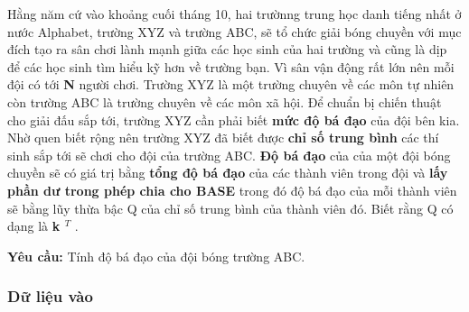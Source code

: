 





    Hằng năm cứ vào khoảng cuối tháng 10, hai trườnng trung học danh tiếng nhất ở nước Alphabet, trường XYZ và trường ABC, sẽ tổ chức giải bóng chuyền với mục đích tạo ra sân chơi lành mạnh giữa các học sinh của hai trường và cũng là dịp để các học sinh tìm hiểu kỹ hơn về trường bạn. Vì sân vận động rất lớn nên mỗi đội có tới    \textbf{     N    }    người chơi. Trường XYZ là một trường chuyên về các môn tự nhiên còn trường ABC là trường chuyên về các môn xã hội. Để chuẩn bị chiến thuật cho giải đấu sắp tới, trường XYZ cần phải biết    \textbf{     mức độ bá đạo    }    của đội bên kia. Nhờ quen biết rộng nên trường XYZ đã biết được    \textbf{     chỉ số trung bình    }    các thí sinh sắp tới sẽ chơi cho đội của trường ABC.    \textbf{     Độ bá đạo    }    của của một đội bóng chuyền sẽ có giá trị bằng    \textbf{     tổng độ bá đạo    }    của các thành viên trong đội và    \textbf{     lấy phần dư trong phép chia cho BASE    }    trong đó độ bá đạo của mỗi thành viên sẽ bằng lũy thừa bậc Q của chỉ số trung bình của thành viên đó. Biết rằng Q có dạng là    \textbf{     k     $^      T     $}    .   



\textbf{     Yêu cầu:    }    Tính độ bá đạo của đội bóng trường ABC.   



\subsubsection{    Dữ liệu vào   }


